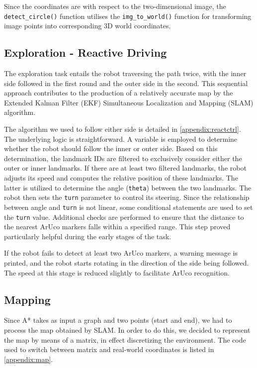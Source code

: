 \documentclass[
	12pt,
]{sty/report_style}
\begin{document}
Since the coordinates are with respect to the two-dimensional image, the \verb|detect_circle()| function utilises the \verb|img_to_world()| function for transforming image points into corresponding 3D world coordinates.


\subsection{Exploration - Reactive Driving}

The exploration task entails the robot traversing the path twice, with the inner side followed in the first round and the outer side in the second. This sequential approach contributes to the production of a relatively accurate map by the Extended Kalman Filter (EKF) Simultaneous Localization and Mapping (SLAM) algorithm.

The algorithm we used to follow either side is detailed in \cref{appendix:reactctrl}. The underlying logic is straightforward. A variable is employed to determine whether the robot should follow the inner or outer side. Based on this determination, the landmark IDs are filtered to exclusively consider either the outer or inner landmarks. If there are at least two filtered landmarks, the robot adjusts its speed and computes the relative position of these landmarks. The latter is utilized to determine the angle (\verb|theta|) between the two landmarks. The robot then sets the \verb|turn| parameter to control its steering. Since the relationship between angle and \verb|turn| is not linear, some conditional statements are used to set the \verb|turn| value. Additional checks are performed to ensure that the distance to the nearest ArUco markers falls within a specified range. This step proved particularly helpful during the early stages of the task.

If the robot fails to detect at least two ArUco markers, a warning message is printed, and the robot starts rotating in the direction of the side being followed. The speed at this stage is reduced slightly to facilitate ArUco recognition.


\subsection{Mapping}

Since A* takes as input a graph and two points (start and end), we had to process the map obtained by SLAM. In order to do this, we decided to represent the map by means of a matrix, in effect discretizing the environment. The code used to switch between matrix and real-world coordinates is listed in \cref{appendix:map}.
\end{document}
